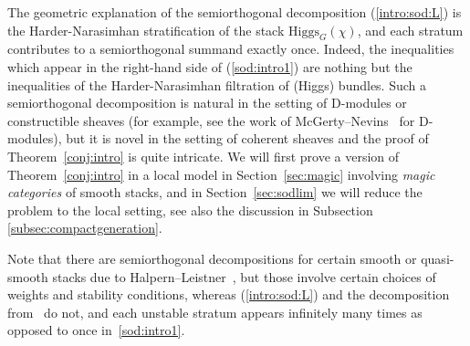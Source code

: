 \documentclass [11pt,oneside,a4paper,mathscr]{amsart}
\theoremstyle{definition}
\newcommand{\Hig}{\mathrm{Higgs}}
\begin{document}
The geometric explanation of the semiorthogonal decomposition (\ref{intro:sod:L}) is the Harder-Narasimhan stratification of the stack $\Hig_G(\chi)$, and each stratum 
contributes to a semiorthogonal summand exactly once. 
Indeed, the inequalities which appear in the right-hand side 
of (\ref{sod:intro1}) are nothing but the inequalities of the Harder-Narasimhan filtration 
of (Higgs) bundles. Such a 
semiorthogonal decomposition is natural in the setting of D-modules or constructible sheaves 
(for example, see the work of McGerty--Nevins~\cite{McNe} for D-modules), but it is novel in the setting of coherent sheaves
and the proof of Theorem~\ref{conj:intro} is quite intricate. 
We will first prove a version of Theorem~\ref{conj:intro} in a local model in Section~\ref{sec:magic} involving \textit{magic categories} of smooth stacks, and in Section~\ref{sec:sodlim} we will reduce the problem to the local setting, see also the discussion in Subsection \ref{subsec:compactgeneration}. 

Note that there are semiorthogonal decompositions for certain smooth or quasi-smooth stacks due to Halpern--Leistner~\cite{halp, HalpTheta, HalpK32}, but those involve certain choices of weights and stability conditions, whereas (\ref{intro:sod:L}) and the decomposition from~\cite{McNe} do not, and each unstable stratum appears infinitely many times as opposed to once in~\eqref{sod:intro1}.
\end{document}
